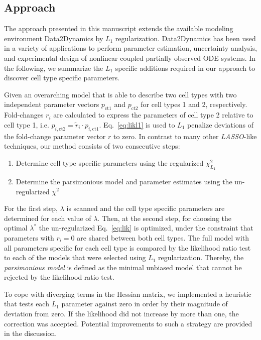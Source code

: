 \documentclass{bioinfo}
\begin{document}
\begin{methods}
\section{Approach}
The approach presented in this manuscript extends the available modeling environment Data2Dynamics \citep{Raue2015} by $L_1$ regularization.
Data2Dynamics has been used in a variety of applications \citep{Becker1404,Bachmann516,Beer2014} to perform parameter estimation, uncertainty analysis, and experimental design of nonlinear coupled partially observed ODE systems.
In the following, we summarize the $L_1$ specific additions required in our approach to discover cell type specific parameters.

Given an overarching model that is able to describe two cell types with two independent parameter vectors $p_\text{ct1}$ and $p_\text{ct2}$ for cell types 1 and 2, respectively.
Fold-changes $r_i$ are calculated to express the parameters of cell type 2 relative to cell type 1, i.e. $p_{i,\text{ct2}} = \tilde r_i \cdot p_{i,\text{ct1}}$.
Eq.~\ref{eq:likl1} is used to $L_1$ penalize deviations of the fold-change parameter vector $r$ to zero.
In contrast to many other \emph{LASSO}-like techniques, our method consists of two consecutive steps:
\begin{enumerate}
\item Determine cell type specific parameters using the regularized $\chi^2_{L_1}$
\item Determine the parsimonious model and parameter estimates using the un-regularized $\chi^2$
\end{enumerate}
For the first step, $\lambda$ is scanned and the cell type specific parameters are determined for each value of $\lambda$.
Then, at the second step, for choosing the optimal $\lambda^*$ the un-regularized Eq.~\ref{eq:lik} is optimized, under the constraint that parameters with $r_i = 0$ are shared between both cell types.
The full model with all parameters specific for each cell type is compared by the likelihood ratio test to each of the models that were selected using $L_1$ regularization.
Thereby, the \emph{parsimonious model} is defined as the minimal unbiased model that cannot be rejected by the likelihood ratio test.

To cope with diverging terms in the Hessian matrix, we implemented a heuristic that tests each $L_1$ parameter against zero in order by their magnitude of deviation from zero.
If the likelihood did not increase by more than one, the correction was accepted.
Potential improvements to such a strategy are provided in the discussion.


\end{methods}
\end{document}

